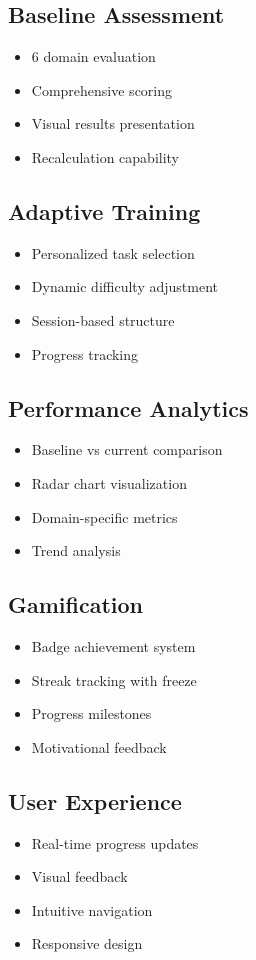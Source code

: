 \documentclass[12pt,a4paper]{article}
\begin{document}
\subsection{Baseline Assessment}
\begin{itemize}
    \item 6 domain evaluation
    \item Comprehensive scoring
    \item Visual results presentation
    \item Recalculation capability
\end{itemize}

\subsection{Adaptive Training}
\begin{itemize}
    \item Personalized task selection
    \item Dynamic difficulty adjustment
    \item Session-based structure
    \item Progress tracking
\end{itemize}

\subsection{Performance Analytics}
\begin{itemize}
    \item Baseline vs current comparison
    \item Radar chart visualization
    \item Domain-specific metrics
    \item Trend analysis
\end{itemize}

\subsection{Gamification}
\begin{itemize}
    \item Badge achievement system
    \item Streak tracking with freeze
    \item Progress milestones
    \item Motivational feedback
\end{itemize}

\subsection{User Experience}
\begin{itemize}
    \item Real-time progress updates
    \item Visual feedback
    \item Intuitive navigation
    \item Responsive design
\end{itemize}
\end{document}
